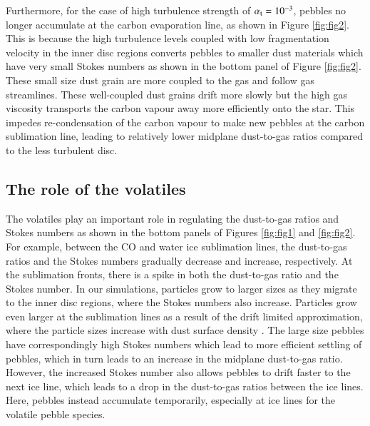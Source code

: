 \documentclass{aa}
\begin{document}
Furthermore, for the case of high turbulence strength of $\alpha_{\rm t}=10^{-3}$, pebbles no longer accumulate at the carbon evaporation line, as shown in Figure \ref{fig:fig2}. This is because the high turbulence levels coupled with low fragmentation velocity in the inner disc regions converts  pebbles to smaller dust materials which have very small Stokes numbers as shown in the bottom panel of Figure \ref{fig:fig2}.   
These small size dust grain are more coupled to the gas and follow gas streamlines. These well-coupled dust grains drift more slowly but the high gas viscosity transports the carbon vapour away more efficiently onto the star. This impedes re-condensation of the carbon vapour to make new  pebbles at the carbon sublimation line, leading to relatively lower midplane dust-to-gas ratios compared to the less turbulent disc.

\subsection{The role of the volatiles}
The volatiles play an important role in regulating the dust-to-gas ratios and Stokes numbers as shown in the bottom panels of Figures \ref{fig:fig1} and \ref{fig:fig2}. For example, between the CO and water ice sublimation lines, the dust-to-gas ratios and the Stokes numbers gradually decrease and increase, respectively. At the sublimation fronts, there is a spike in both the dust-to-gas ratio and the Stokes number. 
In our simulations, particles grow to larger sizes as they migrate to the inner disc regions, where the Stokes numbers also increase.  Particles grow even larger at the sublimation lines as a result of the drift limited approximation, where the particle sizes increase with dust surface density \citep{Birnstiel2015}. The large size pebbles have correspondingly high Stokes numbers which lead to more efficient settling of pebbles, which in turn leads to an increase in the midplane dust-to-gas ratio. However, the increased Stokes number also allows pebbles to drift faster to the next ice line, which leads to a drop in the dust-to-gas ratios between the ice lines. Here, pebbles instead accumulate temporarily, especially at ice lines for the volatile pebble species.
\end{document}
